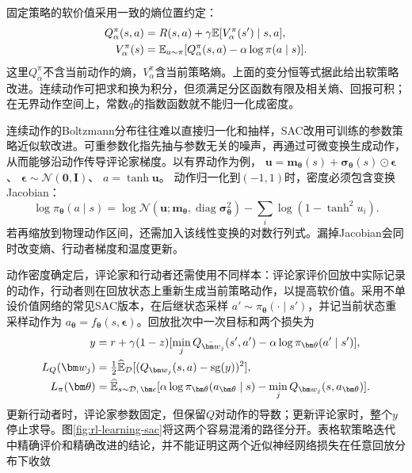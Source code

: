 固定策略的软价值采用一致的熵位置约定：
\begin{align}
  Q_\alpha^\pi(s,a)
    &=R(s,a)+\gamma\mathbb E[V_\alpha^\pi(s')\mid s,a],
       \notag\\
  V_\alpha^\pi(s)
    &=\mathbb E_{a\sim\pi}
        [Q_\alpha^\pi(s,a)-\alpha\log\pi(a\mid s)].
  \label{eq:rl-learning-soft-bellman}
\end{align}
这里$Q_\alpha^\pi$不含当前动作的熵，$V_\alpha^\pi$含当前策略熵。上面的变分恒等式据此给出软策略改进。连续动作可把求和换为积分，但须满足分区函数有限及相关熵、回报可积；在无界动作空间上，常数$q$的指数函数就不能归一化成密度。

连续动作的Boltzmann分布往往难以直接归一化和抽样，SAC改用可训练的参数策略近似软改进。可重参数化指先抽与参数无关的噪声，再通过可微变换生成动作，从而能够沿动作传导评论家梯度。以有界动作为例，
$\bm u=\bm m_{\bm\theta}(s)+\bm\sigma_{\bm\theta}(s)\odot\bm\epsilon$、
$\bm\epsilon\sim\mathcal N(\bm0,\bm I)$、
$a=\tanh\bm u$。
动作归一化到$(-1,1)$时，密度必须包含变换Jacobian：
\[
  \log\pi_{\bm\theta}(a\mid s)
    =\log\mathcal N(\bm u;\bm m_{\bm\theta},
                           \operatorname{diag}\bm\sigma_{\bm\theta}^2)
       -\sum_i\log(1-\tanh^2u_i).
\]
若再缩放到物理动作区间，还需加入该线性变换的对数行列式。漏掉Jacobian会同时改变熵、行动者梯度和温度更新。

动作密度确定后，评论家和行动者还需使用不同样本：评论家评价回放中实际记录的动作，行动者则在回放状态上重新生成当前策略动作，以提高软价值。采用不单设价值网络的常见SAC版本，在后继状态采样
$a'\sim\pi_{\bm\theta}(\cdot\mid s')$，并记当前状态重采样动作为
$a_{\bm\theta}=f_{\bm\theta}(s,\bm\epsilon)$。回放批次中一次目标和两个损失为
\begin{align}
  y&=r+\gamma(1-z)
       [\min_j Q_{\bar{\bm w}_j}(s',a')
                       -\alpha\log\pi_{\bm\theta}(a'\mid s')],
       \notag\\
  L_Q(\bm w_j)&=\tfrac12\widehat{\mathbb E}_{\mathcal D}
                           [(Q_{\bm w_j}(s,a)-\operatorname{sg}(y))^2],
       \notag\\
  L_\pi(\bm\theta)&=
       \widehat{\mathbb E}_{s\sim\mathcal D,\,\bm\epsilon}
       [\alpha\log\pi_{\bm\theta}(a_{\bm\theta}\mid s)
        -\min_j Q_{\bm w_j}(s,a_{\bm\theta})].
  \label{eq:rl-learning-sac-losses}
\end{align}
更新行动者时，评论家参数固定，但保留$Q$对动作的导数；更新评论家时，整个$y$停止求导。图\ref{fig:rl-learning-sac}将这两个容易混淆的路径分开。表格软策略迭代中精确评价和精确改进的结论，并不能证明这两个近似神经网络损失在任意回放分布下收敛

